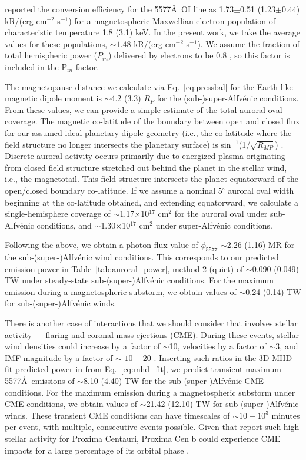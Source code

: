 \documentclass{emulateapj}
\begin{document}
\citet{Steele1990} reported the conversion efficiency for the 5577\AA\ OI line as 1.73$\pm$0.51 (1.23$\pm$0.44) kR/(erg cm$^{-2}$ s$^{-1}$) for a magnetospheric Maxwellian electron population of characteristic temperature 1.8 (3.1) keV. In the present work, we take the average values for these populations, ${\sim} 1.48$ kR/(erg cm$^{-2}$ s$^{-1}$). We assume the fraction of total hemispheric power ($P_{in}$) delivered by electrons to be 0.8 \citep{Hubert2002}, so this factor is included in the P$_{in}$ factor.

The magnetopause distance we calculate via Eq.~\ref{eq:pressbal} for the Earth-like magnetic dipole moment is $\sim$4.2 (3.3) $R_P$ for the (sub-)super-Alfv\'{e}nic conditions. From these values, we can provide a simple estimate of the total auroral oval coverage. The magnetic co-latitude of the boundary between open and closed flux for our assumed ideal planetary dipole geometry (i.e., the co-latitude where the field structure no longer intersects the planetary surface) is sin$^{-1}$(1/$\sqrt{R_{MP}}$) \citep{Kivelson1995}. Discrete auroral activity occurs primarily due to energized plasma originating from closed field structure stretched out behind the planet in the stellar wind, i.e., the magnetotail. This field structure intersects the planet equatorward of the open/closed boundary co-latitude. If we assume a nominal 5$^\circ$ auroral oval width beginning at the co-latitude obtained, and extending equatorward, we calculate a single-hemisphere coverage of $\sim$1.17$\times$10$^{17}$ cm$^2$ for the auroral oval under sub-Alfv\'{e}nic conditions, and $\sim$1.30$\times$10$^{17}$ cm$^2$ under super-Alfv\'{e}nic conditions.

Following the above, we obtain a photon flux value of $\phi_{5577}$ $\sim$2.26 (1.16) MR for the sub-\mbox{(super-)}Alfv\'{e}nic wind conditions. This corresponds to our predicted emission power in Table~\ref{tab:auroral_power}, method 2 (quiet) of $\sim$0.090 (0.049) TW  under steady-state sub-\mbox{(super-)}Alfv\'{e}nic conditions. For the maximum emission during a magnetospheric substorm, we obtain values of $\sim$0.24 (0.14) TW for sub-\mbox{(super-)}Alfv\'{e}nic winds.
 
There is another case of interactions that we should consider that involves stellar activity --- flaring and coronal mass ejections (CME). During these events, stellar wind densities could increase by a factor of $\sim$10, velocities by a factor of $\sim$3, and IMF magnitude by a factor of $\sim$ $10-20$ \citep{Khodachenko2007,Gopalswamy2009}. Inserting such ratios in the 3D MHD-fit predicted power in from Eq.~\ref{eq:mhd_fit}, we predict transient maximum 5577\AA\ emissions of $\sim$8.10 (4.40) TW for the sub-\mbox{(super-)}Alfv\'{e}nic CME conditions. For the maximum emission during a magnetospheric substorm under CME conditions, we obtain values of $\sim$21.42 (12.10) TW for sub-\mbox{(super-)}Alfv\'{e}nic winds. These transient CME conditions can have timescales of ${\sim} 10-10^3$ minutes per event, with multiple, consecutive events possible. Given that \citet{Davenport2016} report such high stellar activity for Proxima Centauri, Proxima Cen b could experience CME impacts for a large percentage of its orbital phase \citep[e.g.,][]{Khodachenko2007}. 
\end{document}
